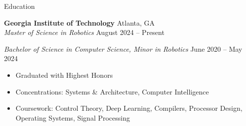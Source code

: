 \documentclass{resume} %
\begin{document}

\vspace{-0.5em}
\begin{rSection}{Education}

{\bf Georgia Institute of Technology} \hfill Atlanta, GA\\
\textit{Master of Science in Robotics} \hfill August 2024 -- Present

\textit{Bachelor of Science in Computer Science, Minor in Robotics} \hfill June 2020 -- May 2024
\vspace{-0.5em}
\begin{itemize}
   \itemsep -5pt {}
   \item Graduated with Highest Honors
   \item Concentrations: Systems \& Architecture, Computer Intelligence
   \item Coursework: Control Theory, Deep Learning, Compilers, Processor Design, Operating Systems,
   Signal Processing
\end{itemize}

\end{rSection}

\end{document}
